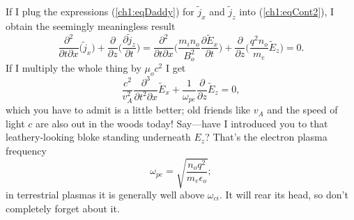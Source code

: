 If I plug the expressions (\ref{ch1:eqDaddy}) for $\tilde j_x$ and $\tilde j_z$ into
(\ref{ch1:eqCont2}), I obtain the seemingly meaningless result
\begin{equation*}
    \dfrac{\partial^2}{\partial t \partial x} \Big( \tilde j_x \Big) + \dfrac{\partial}{\partial z}
    \Big( \dfrac{\partial \tilde j_z}{\partial t} \Big) = \dfrac{\partial^2}{\partial
      t \partial x} \Big(\dfrac{m_i n_o }{B_o^2}\dfrac{\partial \tilde E_x}{\partial t} \Big) +
    \dfrac{\partial}{\partial z} \Big( \dfrac{q^2 n_o}{m_e} \tilde E_z \Big) = 0.
\end{equation*}
If I multiply the whole thing by $\mu_o c^2$ I get 
\begin{equation} \label{ch1:eqMeaningless}
  \dfrac{c^2}{v_A^2}\dfrac{\partial^3 }{\partial t^2 \partial x} \tilde E_x + \dfrac{1}{\omega_{pe}}\dfrac{\partial}{\partial z} \tilde E_z = 0,
\end{equation}
which you have to admit is a little better; old friends like $v_A$ and the speed
of light $c$ are also out in the woods today! Say---have I introduced you to
that leathery-looking bloke standing underneath $E_z$? That's the electron
plasma frequency
\begin{equation*}
\omega_{pe} = \sqrt{ \dfrac{n_o q^2}{m_e \epsilon_o}};
\end{equation*}
in terrestrial plasmas it is generally well above $\omega_{ci}$. It will rear
its head, so don't completely forget about it.  

